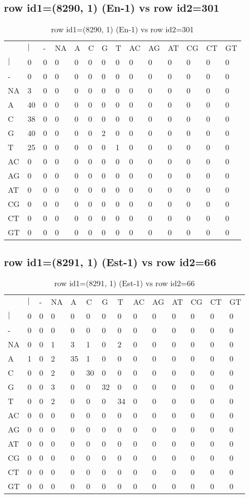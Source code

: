 \subsection{row id1=(8290, 1) (En-1) vs row id2=301}
\begin{center}
\begin{longtable}{|l|l|l|l|l|l|l|l|l|l|l|l|l|l|}
\caption{row id1=(8290, 1) (En-1) vs row id2=301} \label{table_dm258}\\
\hline
\\
\hline
&$|$&-&NA&A&C&G&T&AC&AG&AT&CG&CT&GT\\
$|$&0&0&0&0&0&0&0&0&0&0&0&0&0\\
-&0&0&0&0&0&0&0&0&0&0&0&0&0\\
NA&3&0&0&0&0&0&0&0&0&0&0&0&0\\
A&40&0&0&0&0&0&0&0&0&0&0&0&0\\
C&38&0&0&0&0&0&0&0&0&0&0&0&0\\
G&40&0&0&0&0&2&0&0&0&0&0&0&0\\
T&25&0&0&0&0&0&1&0&0&0&0&0&0\\
AC&0&0&0&0&0&0&0&0&0&0&0&0&0\\
AG&0&0&0&0&0&0&0&0&0&0&0&0&0\\
AT&0&0&0&0&0&0&0&0&0&0&0&0&0\\
CG&0&0&0&0&0&0&0&0&0&0&0&0&0\\
CT&0&0&0&0&0&0&0&0&0&0&0&0&0\\
GT&0&0&0&0&0&0&0&0&0&0&0&0&0\\
\hline
\end{longtable}
\end{center}

\subsection{row id1=(8291, 1) (Est-1) vs row id2=66}
\begin{center}
\begin{longtable}{|l|l|l|l|l|l|l|l|l|l|l|l|l|l|}
\caption{row id1=(8291, 1) (Est-1) vs row id2=66} \label{table_dm260}\\
\hline
\\
\hline
&$|$&-&NA&A&C&G&T&AC&AG&AT&CG&CT&GT\\
$|$&0&0&0&0&0&0&0&0&0&0&0&0&0\\
-&0&0&0&0&0&0&0&0&0&0&0&0&0\\
NA&0&0&1&3&1&0&2&0&0&0&0&0&0\\
A&1&0&2&35&1&0&0&0&0&0&0&0&0\\
C&0&0&2&0&30&0&0&0&0&0&0&0&0\\
G&0&0&3&0&0&32&0&0&0&0&0&0&0\\
T&0&0&2&0&0&0&34&0&0&0&0&0&0\\
AC&0&0&0&0&0&0&0&0&0&0&0&0&0\\
AG&0&0&0&0&0&0&0&0&0&0&0&0&0\\
AT&0&0&0&0&0&0&0&0&0&0&0&0&0\\
CG&0&0&0&0&0&0&0&0&0&0&0&0&0\\
CT&0&0&0&0&0&0&0&0&0&0&0&0&0\\
GT&0&0&0&0&0&0&0&0&0&0&0&0&0\\
\hline
\end{longtable}
\end{center}

